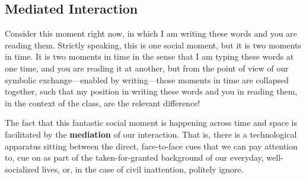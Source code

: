 \documentclass[
  letterpaper,
  DIV=11,
  numbers=noendperiod,
  oneside]{scrartcl}
\begin{document}
\subsection{Mediated Interaction}\label{mediated-interaction}

Consider this moment right now, in which I am writing these words and
you are reading them. Strictly speaking, this is one social moment, but
it is two moments in time. It is two moments in time in the sense that I
am typing these words at one time, and you are reading it at another,
but from the point of view of our symbolic exchange---enabled by
writing---those moments in time are collapsed together, such that my
position in writing these words and you in reading them, in the context
of the class, are the relevant difference!

The fact that this fantastic social moment is happening across time and
space is facilitated by the \textbf{mediation} of our interaction. That
is, there is a technological apparatus sitting between the direct,
face-to-face cues that we can pay attention to, cue on as part of the
taken-for-granted background of our everyday, well-socialized lives, or,
in the case of civil inattention, politely ignore.
\end{document}
